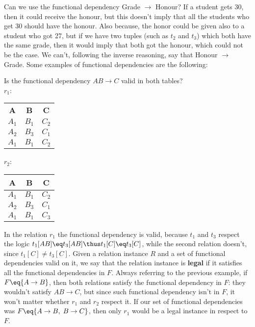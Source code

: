Can we use the functional dependency Grade $\rightarrow$ Honour? If a student gets 30, then it could receive the honour, but this doesn't imply that all the students who get 30 should have the honour. Also because, the honor could be given also to a student who got 27, but if we have two tuples (such as $t_2$ and $t_3$) which both have the same grade, then it would imply that both got the honour, which could not be the case. We can't, following the inverse reasoning, say that Honour $\rightarrow$ Grade.
\nwl
Some examples of functional dependencies are the following:
\begin{center}
    Is the functional dependency $AB \rightarrow C$ valid in both tables? \\
    \vspace{12pt}
    $r_1$: \quad \begin{tabular}{|c|c|c|}
        \rowcolor{maindoccol!60} \hline 
        \textbf{A} & \textbf{B} & \textbf{C} \\
        \rowcolor{green!20} \hline
        $A_1$ & $B_1$ & $C_2$ \\
        \hline
        $A_2$ & $B_3$ & $C_1$ \\
        \hline
        \rowcolor{green!20}
        $A_1$ & $B_1$ & $C_2$ \\
        \hline
    \end{tabular} \quad \quad \quad $r_2$: \quad \begin{tabular}{|c|c|c|}
        \hline \rowcolor{maindoccol!60}
        \textbf{A} & \textbf{B} & \textbf{C} \\
        \hline \rowcolor{yellow!20}
        $A_1$ & $B_1$ & $C_2$ \\
        \hline 
        $A_2$ & $B_3$ & $C_1$ \\
        \hline \rowcolor{yellow!20}
        $A_1$ & $B_1$ & $C_3$ \\
        \hline
    \end{tabular}
\end{center}

In the relation $r_1$ the functional dependency is valid, because $t_1$ and $t_3$ respect the logic $t_1[AB] \eq t_3[AB] \thus t_1[C] \eq t_3[C]$, while the second relation doesn't, since $t_1[C] \neq t_3[C]$. Given a relation instance $R$ and a set of functional dependencies valid on it, we say that the relation instance is \textbf{legal} if it satisfies all the functional dependencies in $F$. Always referring to the previous example, if $F \eq \{ A \rightarrow B \}$, then both relations satisfy the functional dependency in $F$: they wouldn't satisfy $AB \rightarrow C$, but since such functional dependency isn't in $F$, it won't matter whether $r_1$ and $r_2$ respect it. If our set of functional dependencies was $F \eq \{ A \rightarrow B, \; B \rightarrow C \}$, then only $r_1$ would be a legal instance in respect to $F$.

